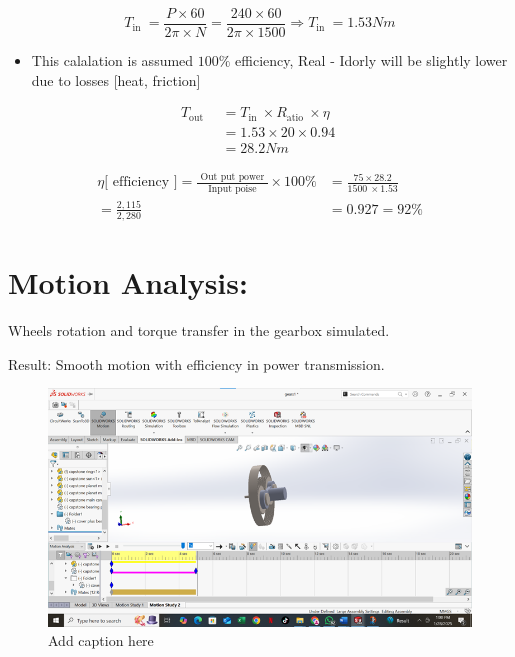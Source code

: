 \documentclass[../../main]{subfiles}
\begin{document}
\[T_{\text{in~}} = \frac{P \times 60}{2\pi \times N} = \frac{240 \times 60}{2\pi \times 1500} \Rightarrow T_{\text{in~}} = 1.53Nm\]

\begin{itemize}
\item
  This calalation is assumed \(100\%\) efficiency, Real - Idorly will be
  slightly lower due to losses {[}heat, friction{]}
\end{itemize}

\[\begin{aligned}
T_{\text{out~}}  \  &= T_{\text{in~}} \times R_{\text{atio~}} \times \eta\text{~~} \\
\  &= 1.53 \times 20 \times 0.94 \\
\  &= 28.2Nm
\end{aligned}\]

\[\begin{aligned}
\eta\lbrack\text{~efficiency~}\rbrack = \frac{\text{~Out put power~}}{\text{~Input poise~}} \times 100\% &= \frac{75 \times 28.2}{1500\  \times 1.53} \\
= \frac{2,115}{2,280} &= 0.927 = 92\%
\end{aligned}\]
\newpage


\section{Motion Analysis:}

Wheels\textquotesingle{} rotation and torque transfer in the gearbox
simulated.

Result: Smooth motion with efficiency in power transmission.
\begin{figure}[h]
  \centering
\includegraphics[]{sublatex/Opryrmi/media/image7.png}
\caption{Add caption here}
\end{figure}
\end{document}
